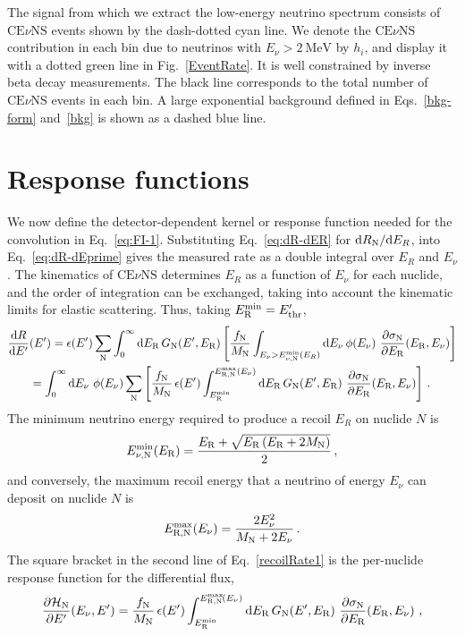 \documentclass[a4paper,11pt]{article}
\renewcommand\({\left(}
\renewcommand\){\right)}
\renewcommand\[{\left[}
\renewcommand\]{\right]}
\newcommand{\tx}{\text}
\newcommand{\df}{\text{d}}
\newcommand{\al}[1]{\begin{align}#1\end{align}}
\newcommand{\paren}[1]{\left(#1\right)}
\newcommand{\pn}[1]{\left(#1\right)}
\newcommand{\sqbr}[1]{\left[#1\right]}
\newcommand{\fn}[1]{\!\paren{#1}} %
\newcommand{\nn}{\nonumber\\}
\newcommand{\p}{\partial}
\theoremstyle{definition}
\newcommand{\ov}{\over}
\newcommand{\mc}{\mathcal}
\newcommand{\pr}{\prime}
\newcommand{\MeV}{\text{MeV}}
\newcommand{\CEnNS}{\text{CE}\nu\text{NS}}
\begin{document}
The signal from which we extract the low-energy neutrino spectrum consists of $\CEnNS$ events shown by the 
dash-dotted cyan line. We denote the $\CEnNS$ contribution in each bin due to neutrinos with $E_\nu > 2~\MeV$ by $h_i$, and display it with a dotted green line in Fig.~\ref{EventRate}. It is well constrained by inverse beta decay measurements.  The black line corresponds to the total number of $\CEnNS$ events in each bin.
A large exponential background defined in Eqs.~\eqref{bkg-form} and~\eqref{bkg} is shown as a dashed blue line. 

\section{Response functions }
\label{Sec:CGBprocedure}

We now define the detector-dependent kernel or response function needed for the convolution in Eq.~\eqref{eq:FI-1}. 
Substituting Eq.~\eqref{eq:dR-dER} for $\df R_{\rm N}/\df E_R$,  into Eq.~\eqref{eq:dR-dEprime} gives the measured rate as a double integral over $E_R$ and $E_\nu$. The kinematics of $\CEnNS$ determines $E_R$ as a function of $E_\nu$ for each nuclide, and the order of integration can be exchanged, taking into account the kinematic limits for elastic scattering. Thus, taking $E_{\rm R}^{\rm min}=E^\pr_{\rm thr}$,
\al{
    {\df R\ov \df E^\pr}&\fn{E^\pr} = \epsilon\fn{E^\pr}\sum_\tx{N} \int_0^\infty \df E_\tx{R}\, G_\tx{N}\fn{E^\pr, E_\tx{R}}\sqbr{{f_{\rm N}\ov M_{\rm N}}\int_{E_\nu > E_{\nu,{\rm N}}^{\rm min}(E_R)} \df E_\nu\, \phi\fn{E_\nu}\, {\p \sigma_{\rm N}\ov \p E_\tx{R}}\fn{E_\tx{R}, E_\nu}}\nn
    &= \int_0^\infty \df E_\nu~\phi\fn{E_\nu}\sum_\tx{N}\sqbr{{f_{\rm N}\ov M_{\rm N}}\,\epsilon\fn{E^\pr}\int_{E_{\tx{R}}^{\tx{min}}}^{E_{{\rm R, N}}^{\rm max}(E_\nu)} \df E_\tx{R}\, G_\tx{N}\fn{E^\pr, E_\tx{R}}\, {\p \sigma_{\rm N}\ov \p E_\tx{R}}\fn{E_\tx{R}, E_\nu}}\,.
\label{recoilRate1}
} 
The minimum neutrino energy required to produce a recoil $E_R$ on nuclide $N$ is
\al{
 E_{\nu, {\rm N}}^\tx{min}\fn{E_\tx{R}} = {{E_\tx{R} + \sqrt{E_\tx{R}\pn{E_\tx{R} + 2 M_\tx{N}}}}\ov 2}\,,
}
and conversely, the maximum recoil energy that a neutrino of energy $E_\nu$ can deposit on nuclide $N$ is
\al{
    E_{\tx{R}, {\rm N}}^\tx{max}\fn{E_\nu} = {2 E_\nu^2\ov M_\tx{N} + 2 E_\nu}\,.
\label{maxRecoil}
}
The square bracket in the second line of Eq.~\eqref{recoilRate1} is the per-nuclide response function for the differential flux,
\al{
    {\p\mc H_{\rm N}\ov\p E^\pr}\fn{E_\nu, E^\pr} = {f_{\rm N} \ov M_{\rm N}}\,\epsilon\fn{E^\pr}\int_{E_{\tx{R}}^{\tx{min}}}^{E_{\tx{R}, {\rm N}}^\tx{max}\fn{E_\nu}} \df E_\tx{R}\, G_\tx{N}\fn{E^\pr, E_\tx{R}}\, {\p \sigma_{\rm N}\ov \p E_\tx{R}}\fn{E_\tx{R}, E_\nu}\,,
    \label{partialdcurlyH} 
}
\end{document}
